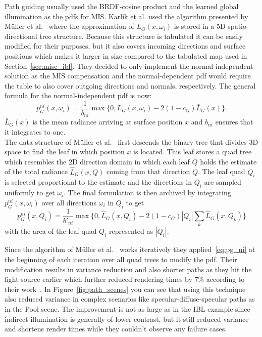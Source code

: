 Path guiding usually used the BRDF-cosine product and the learned global illumination as the pdfs for MIS.
Karl\'ik et al. used the algorithm presented by M\"uller et al.~\cite{mueller2017}
where the approximation of $ L_G(x, \omega_i) $ is stored in a 5D spatio-directional tree structure.
Because this structure is tabulated it can be easily modified for their purposes,
but it also covers incoming directions and surface positions which makes it larger in size compared to the tabulated map used in Section~\ref{sec:misc_ibl}.
They decided to only implement the normal-independent solution
as the MIS compensation and the normal-dependent pdf would require the table to also cover outgoing directions and normals, respectively.
The general formula for the normal-independent pdf is now:
$$ p_G^{ni}(x, \omega_i) = \frac{1}{b_{ni}} \max \{ 0, L_G(x, \omega_i) - 2 (1 - c_G) \bar{L}_G(x) \}. $$
$ \bar{L}_G(x) $ is the mean radiance arriving at surface position $ x $ and $ b_{ni} $ ensures that it integrates to one.\\
The data structure of M\"uller et al.~\cite{mueller2017} first descends the binary tree that divides 3D space to find the leaf in which position $ x $ is located.
This leaf stores a quad tree which resembles the 2D direction domain in which each leaf $ Q $ holds the estimate of the total radiance $ \hat{L}_G(x, Q) $ coming from that direction $ Q $.
The leaf quad $ Q_i $ is selected proportional to the estimate and the directions in $ Q_i $ are sampled uniformly to get $ \omega_i $.
The final formulation is then archived by integrating $ p_G^{ni}(x, \omega_i) $ over all directions $ \omega_i $ in $ Q_i $ to get
\begin{equation}
    \label{eq:pg_ni}
    p_G^{ni}(x, Q_i) = \frac{1}{b'_{ni}} \max \{ 0, \hat{L}_G(x, Q_i) - 2 (1 - c_G) |Q_i| \sum_k \hat{L}_G(x, Q_k) \}
\end{equation}
with the area of the leaf quad $ Q_i $ represented as $ |Q_i| $.

Since the algorithm of M\"uller et al.~\cite{mueller2017} works iteratively they applied~\ref{eq:pg_ni} at the beginning of each iteration over all quad trees to modify the pdf.
Their modification results in variance reduction and also shorter paths
as they hit the light source earlier which further reduced rendering times by 7\% according to their work~\cite[Section~9]{Karlik2019}.
In Figure~\ref{fig:path_scenes} you can see that using this technique also reduced variance in complex scenarios like specular-diffuse-specular paths as in the Pool scene.
The improvement is not as large as in the IBL example since indirect illumination is generally of lower contrast,
but it still reduced variance and shortens render times while they couldn't observe any failure cases.

